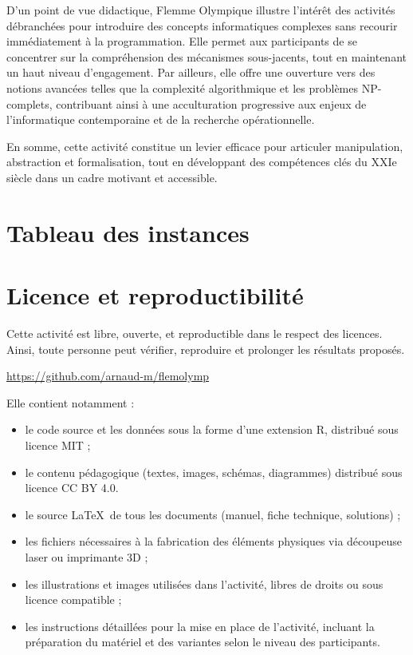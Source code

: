 \documentclass[a4paper,twoside]{article}
\begin{document}
D'un point de vue didactique, Flemme Olympique illustre l'intérêt des activités débranchées pour introduire des concepts informatiques complexes sans recourir immédiatement à la programmation. Elle permet aux participants de se concentrer sur la compréhension des mécanismes sous-jacents, tout en maintenant un haut niveau d'engagement. Par ailleurs, elle offre une ouverture vers des notions avancées telles que la complexité algorithmique et les problèmes NP-complets, contribuant ainsi à une acculturation progressive aux enjeux de l'informatique contemporaine et de la recherche opérationnelle.

En somme, cette activité constitue un levier efficace pour articuler manipulation, abstraction et formalisation, tout en développant des compétences clés du XXIe siècle dans un cadre motivant et accessible.

\section{Tableau des instances}




\section{Licence et reproductibilité}

Cette activité est libre, ouverte, et reproductible dans le respect des licences.
Ainsi, toute personne peut vérifier, reproduire et prolonger les résultats proposés.

\begin{center}
  \url{https://github.com/arnaud-m/flemolymp}
\end{center}

Elle contient notamment :
\begin{itemize}
\item le code source et les données sous la forme d'une extension R, distribué sous licence MIT ;
\item le contenu pédagogique (textes, images, schémas, diagrammes) distribué sous licence CC BY 4.0.
\item le source \LaTeX\ de tous les documents (manuel, fiche technique, solutions) ;
\item les fichiers nécessaires à la fabrication des éléments physiques via découpeuse laser ou imprimante 3D ;
\item les illustrations et images utilisées dans l'activité, libres de droits ou sous licence compatible ;
\item les instructions détaillées pour la mise en place de l'activité, incluant la préparation du matériel et des variantes selon le niveau des participants.
\end{itemize}


\clearpage
\ifleaflet
  \thispagestyle{empty}
  ~
  \cleardoublepage
\fi


{}




\ifleaflet
  \clearpage
  \thispagestyle{empty}
  ~
  \cleardoublepage
  \thispagestyle{empty}
  ~
\fi
\end{document}
